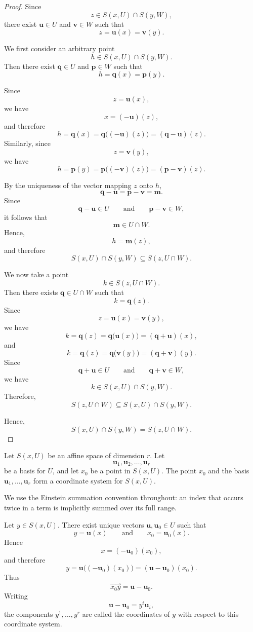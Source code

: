 \documentclass[12pt]{article}
\begin{document}
\begin{proof}
Since
\[
z\in S(x,U)\cap S(y,W),
\]
there exist \(\mathbf{u}\in U\) and \(\mathbf{v}\in W\) such that
\[
z=\mathbf{u}(x)=\mathbf{v}(y).
\]

We first consider an arbitrary point
\[
h\in S(x,U)\cap S(y,W).
\]
Then there exist \(\mathbf{q}\in U\) and \(\mathbf{p}\in W\) such that
\[
h=\mathbf{q}(x)=\mathbf{p}(y).
\]

Since
\[
z=\mathbf{u}(x),
\]
we have
\[
x=(-\mathbf{u})(z),
\]
and therefore
\[
h
=
\mathbf{q}(x)
=
\mathbf{q}\bigl((-\mathbf{u})(z)\bigr)
=
(\mathbf{q}-\mathbf{u})(z).
\]
Similarly, since
\[
z=\mathbf{v}(y),
\]
we have
\[
h
=
\mathbf{p}(y)
=
\mathbf{p}\bigl((-\mathbf{v})(z)\bigr)
=
(\mathbf{p}-\mathbf{v})(z).
\]

By the uniqueness of the vector mapping \(z\) onto \(h\),
\[
\mathbf{q}-\mathbf{u}
=
\mathbf{p}-\mathbf{v}
=
\mathbf{m}.
\]
Since
\[
\mathbf{q}-\mathbf{u}\in U
\qquad\text{and}\qquad
\mathbf{p}-\mathbf{v}\in W,
\]
it follows that
\[
\mathbf{m}\in U\cap W.
\]
Hence,
\[
h=\mathbf{m}(z),
\]
and therefore
\[
S(x,U)\cap S(y,W)
\subseteq
S(z,U\cap W).
\]

We now take a point
\[
k\in S(z,U\cap W).
\]
Then there exists \(\mathbf{q}\in U\cap W\) such that
\[
k=\mathbf{q}(z).
\]
Since
\[
z=\mathbf{u}(x)=\mathbf{v}(y),
\]
we have
\[
k
=
\mathbf{q}(z)
=
\mathbf{q}\bigl(\mathbf{u}(x)\bigr)
=
(\mathbf{q}+\mathbf{u})(x),
\]
and
\[
k
=
\mathbf{q}(z)
=
\mathbf{q}\bigl(\mathbf{v}(y)\bigr)
=
(\mathbf{q}+\mathbf{v})(y).
\]
Since
\[
\mathbf{q}+\mathbf{u}\in U
\qquad\text{and}\qquad
\mathbf{q}+\mathbf{v}\in W,
\]
we have
\[
k\in S(x,U)\cap S(y,W).
\]
Therefore,
\[
S(z,U\cap W)
\subseteq
S(x,U)\cap S(y,W).
\]

Hence,
\[
S(x,U)\cap S(y,W)
=
S(z,U\cap W).
\]
\end{proof}

\begin{definition}
Let \(S(x,U)\) be an affine space of dimension \(r\). Let
\[
\mathbf{u}_1,\mathbf{u}_2,\ldots,\mathbf{u}_r
\]
be a basis for \(U\), and let \(x_0\) be a point in \(S(x,U)\). The point \(x_0\) and the basis \(\mathbf{u}_1,\ldots,\mathbf{u}_r\) form a coordinate system for \(S(x,U)\).

We use the Einstein summation convention throughout: an index that occurs twice in a term is implicitly summed over its full range.

Let \(y\in S(x,U)\). There exist unique vectors
\(\mathbf{u},\mathbf{u}_0\in U\) such that
\[
y=\mathbf{u}(x)
\qquad\text{and}\qquad
x_0=\mathbf{u}_0(x).
\]
Hence
\[
x=(-\mathbf{u}_0)(x_0),
\]
and therefore
\[
y
=
\mathbf{u}\bigl((-\mathbf{u}_0)(x_0)\bigr)
=
(\mathbf{u}-\mathbf{u}_0)(x_0).
\]
Thus
\[
\overrightarrow{x_0y}=\mathbf{u}-\mathbf{u}_0.
\]
Writing
\[
\mathbf{u}-\mathbf{u}_0=y^i\mathbf{u}_i,
\]
the components \(y^1,\ldots,y^r\) are called the coordinates of \(y\) with respect to this coordinate system.
\end{definition}
\end{document}
